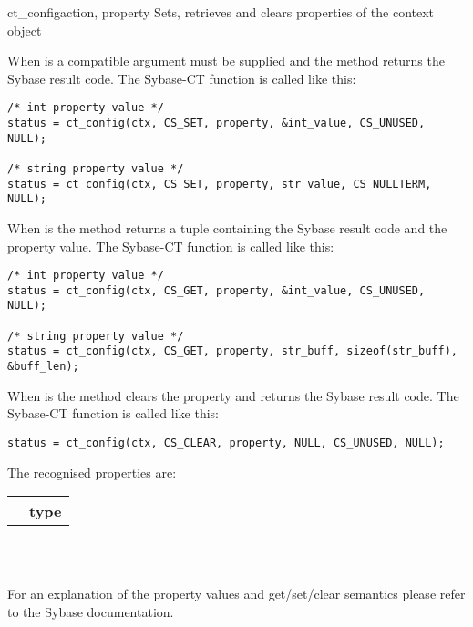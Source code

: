 \begin{methoddesc}[CS_CONTEXT]{ct_config}{action, property }
Sets, retrieves and clears properties of the context object

When  is  a compatible  argument
must be supplied and the method returns the Sybase result code.  The
Sybase-CT  function is called like this:

\begin{verbatim}
/* int property value */
status = ct_config(ctx, CS_SET, property, &int_value, CS_UNUSED, NULL);

/* string property value */
status = ct_config(ctx, CS_SET, property, str_value, CS_NULLTERM, NULL);
\end{verbatim}

When  is  the method returns a tuple
containing the Sybase result code and the property value.  The
Sybase-CT  function is called like this:

\begin{verbatim}
/* int property value */
status = ct_config(ctx, CS_GET, property, &int_value, CS_UNUSED, NULL);

/* string property value */
status = ct_config(ctx, CS_GET, property, str_buff, sizeof(str_buff), &buff_len);
\end{verbatim}

When  is  the method clears the property
and returns the Sybase result code.  The Sybase-CT
 function is called like this:

\begin{verbatim}
status = ct_config(ctx, CS_CLEAR, property, NULL, CS_UNUSED, NULL);
\end{verbatim}

The recognised properties are:

\begin{longtable}{l|l}
\var{property} & type \\
\hline
\code{CS_LOGIN_TIMEOUT} & \code{int} \\
\code{CS_MAX_CONNECT}   & \code{int} \\
\code{CS_NETIO}         & \code{int} \\
\code{CS_NO_TRUNCATE}   & \code{int} \\
\code{CS_TEXTLIMIT}     & \code{int} \\
\code{CS_TIMEOUT}       & \code{int} \\
\code{CS_VER_STRING}    & \code{string} \\
\code{CS_VERSION}       & \code{string} \\
\end{longtable}

For an explanation of the property values and get/set/clear semantics
please refer to the Sybase documentation.
\end{methoddesc}

